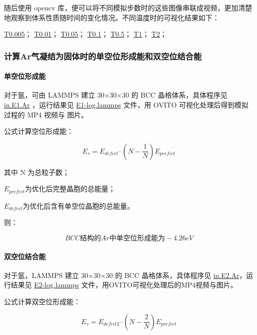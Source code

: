 \documentclass[
]{article}
\begin{document}
随后使用 opencv
库，便可以将不同模拟步数时的这些图像串联成视频，更加清楚地观察到体系性质随时间的变化情况。不同温度时的可视化结果如下：

\href{1_md2_lammps/T0.005/md2_md2_0504_T0.005_ev.avi}{T0.005}；
\href{1_md2_lammps/T0.01/md2_md2_0504_T0.01_ev.avi}{T0.01}；
\href{1_md2_lammps/T0.05/md2_md2_0504_T0.05_ev.avi}{T0.05}；
\href{1_md2_lammps/T0.1/md2_md2_0504_T0.1_ev.avi}{T0.1}；
\href{1_md2_lammps/T0.5/md2_md2_0504_T0.5_ev.avi}{T0.5}；
\href{1_md2_lammps/T1/md2_md2_0504_T1_ev.avi}{T1}；
\href{1_md2_lammps/T2/md2_md2_0504_T2_ev.avi}{T2}；

\hypertarget{header-n94}{%
\subsubsection{计算Ar气凝结为固体时的单空位形成能和双空位结合能}\label{header-n94}}

\hypertarget{header-n95}{%
\paragraph{单空位形成能}\label{header-n95}}

对于氩，可由 LAMMPS 建立 30×30×30 的 BCC 晶格体系，具体程序见
\href{lammps/in.E1.Ar}{in.E1.Ar} ，运行结果见
\href{lammps/E1-log.lammps}{E1-log.lammps} 文件，用 OVITO
可视化处理后得到模拟过程的 MP4 视频与 图片。

公式计算空位形成能：

\[E_v= E_{defect} – (N-\frac{1}{N})E_{prefect}\]

其中 N 为总粒子数；

\(E_{prefect}\)为优化后完整晶胞的总能量；

\(E_{defect}\)为优化后含有单空位晶胞的总能量。

则：

\[BCC 结构的 Ar 中单空位形成能为 -4.26eV\]

\hypertarget{header-n105}{%
\paragraph{双空位结合能}\label{header-n105}}

对于氩，LAMMPS 建立 30×30×30 的 BCC 晶格体系，具体程序见
\href{lammps/in.E2.Ar}{in.E2.Ar}，运行结果见
\href{lammps/E2-log.lammps}{E2-log.lammps}
文件，用OVITO可视化处理后的MP4视频与图片。

公式计算双空位形成能：

\[E_v= E_{defect2} – (N-\frac{2}{N})E_{prefect}\]
\end{document}
